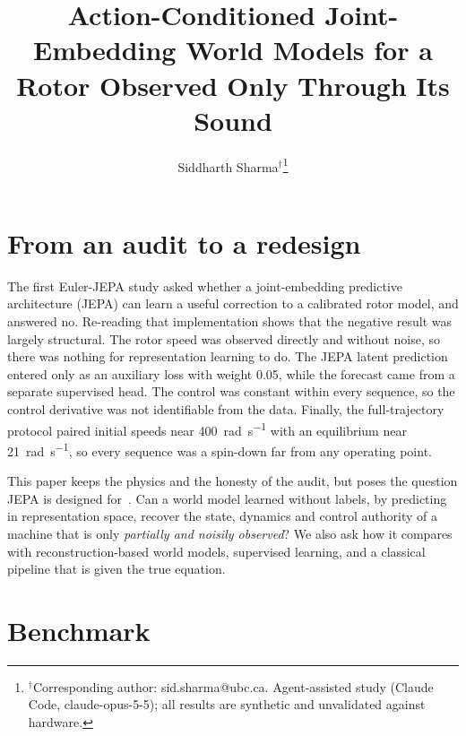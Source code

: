 \documentclass[10pt,journal]{IEEEtran}
\title{Action-Conditioned Joint-Embedding World Models for a Rotor Observed Only Through Its Sound}
\author{Siddharth Sharma$^{\dagger}$\thanks{$^{\dagger}$Corresponding author: sid.sharma@ubc.ca. Agent-assisted study (Claude Code, claude-opus-5-5); all results are synthetic and unvalidated against hardware.}}
\begin{document}
\maketitle



\section{From an audit to a redesign}
The first Euler-JEPA study asked whether a joint-embedding predictive architecture (JEPA) can learn a useful correction to a calibrated rotor model, and answered no. Re-reading that implementation shows that the negative result was largely structural. The rotor speed was observed directly and without noise, so there was nothing for representation learning to do. The JEPA latent prediction entered only as an auxiliary loss with weight 0.05, while the forecast came from a separate supervised head. The control was constant within every sequence, so the control derivative was not identifiable from the data. Finally, the full-trajectory protocol paired initial speeds near \SI{400}{\radian\per\second} with an equilibrium near \SI{21}{\radian\per\second}, so every sequence was a spin-down far from any operating point.

This paper keeps the physics and the honesty of the audit, but poses the question JEPA is designed for~\cite{assran2023ijepa,bardes2024vjepa}. Can a world model learned without labels, by predicting in representation space, recover the state, dynamics and control authority of a machine that is only \emph{partially and noisily observed}? We also ask how it compares with reconstruction-based world models, supervised learning, and a classical pipeline that is given the true equation.

\section{Benchmark}
\end{document}
